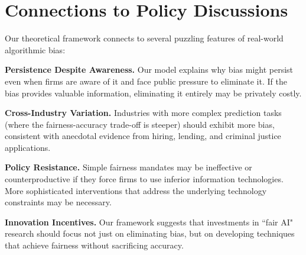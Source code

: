 \section{Connections to Policy Discussions}

Our theoretical framework connects to several puzzling features of real-world algorithmic bias:

\textbf{Persistence Despite Awareness.} Our model explains why bias might persist even when firms are aware of it and face public pressure to eliminate it. If the bias provides valuable information, eliminating it entirely may be privately costly.

\textbf{Cross-Industry Variation.} Industries with more complex prediction tasks (where the fairness-accuracy trade-off is steeper) should exhibit more bias, consistent with anecdotal evidence from hiring, lending, and criminal justice applications.

\textbf{Policy Resistance.} Simple fairness mandates may be ineffective or counterproductive if they force firms to use inferior information technologies. More sophisticated interventions that address the underlying technology constraints may be necessary.

\textbf{Innovation Incentives.} Our framework suggests that investments in ``fair AI" research should focus not just on eliminating bias, but on developing techniques that achieve fairness without sacrificing accuracy.